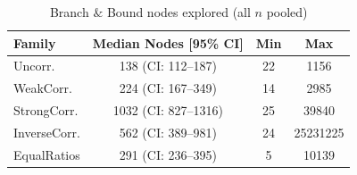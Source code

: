 \begin{table}[tb]
\centering
\caption{Branch $\&$ Bound nodes explored (all $n$ pooled)}
\label{tab:bb-nodes}
\begin{tabular}{lccc}
\toprule
Family & Median Nodes [95\% CI] & Min & Max \\
\midrule
Uncorr. & 138 (CI: 112–187) & 22 & 1156 \\
WeakCorr. & 224 (CI: 167–349) & 14 & 2985 \\
StrongCorr. & 1032 (CI: 827–1316) & 25 & 39840 \\
InverseCorr. & 562 (CI: 389–981) & 24 & 25231225 \\
EqualRatios & 291 (CI: 236–395) & 5 & 10139 \\
\bottomrule
\end{tabular}
\end{table}
